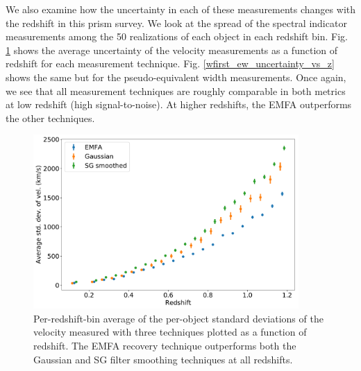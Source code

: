 We also examine how the uncertainty in each of these measurements changes with the redshift in this prism survey. We look at the spread of the spectral indicator measurements among the 50 realizations of each object in each redshift bin. Fig. \ref{wfirst_vel_uncertainty_vs_z} shows the average uncertainty of the velocity measurements as a function of redshift for each measurement technique. Fig. \ref{wfirst_ew_uncertainty_vs_z} shows the same but for the pseudo-equivalent width measurements. Once again, we see that all measurement techniques are roughly comparable in both metrics at low redshift (high signal-to-noise). At higher redshifts, the EMFA outperforms the other techniques.

\begin{figure}[!htb]
    \centering
    \includegraphics[width=0.9\textwidth]{figures/si_feat_pca/wfirst_vel_uncert.pdf}
    \caption{Per-redshift-bin average of the per-object standard deviations of the velocity measured with three techniques plotted as a function of redshift. The EMFA recovery technique outperforms both the Gaussian and SG filter smoothing techniques at all redshifts.}
    \label{wfirst_vel_uncertainty_vs_z}
\end{figure}

